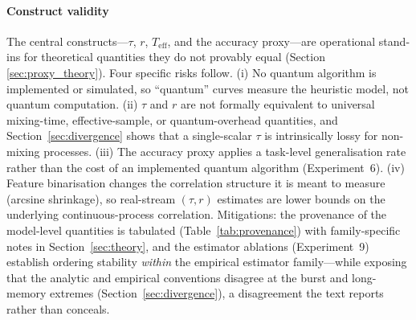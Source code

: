 \documentclass[sensors,article,submit,pdftex,moreauthors]{Definitions/mdpi}
\newcommand{\Teff}{T_{\mathrm{eff}}}
\providecommand{\DIFadd}[1]{{\protect\color{blue}#1}} %
\providecommand{\DIFdel}[1]{} %
\providecommand{\DIFaddbegin}{} %
\providecommand{\DIFaddend}{} %
\providecommand{\DIFdelbegin}{} %
\providecommand{\DIFdelend}{} %
\begin{document}
\paragraph{\DIFadd{Construct validity}} \DIFadd{The central constructs---$\tau$, }\DIFaddend $r$\DIFdelbegin \DIFdel{are paper-defined operational labels }\DIFdelend \DIFaddbegin \DIFadd{, $\Teff$, and the accuracy proxy---are operational stand-ins for theoretical quantities they do not provably equal }\DIFaddend (Section~\DIFdelbegin \DIFdel{\ref{sec:prelim}); equivalence to the exact correlation parameters of }%
\DIFdel{is not proven and is deferred to follow-on work. }%
\textbf{\DIFdel{Classical baselines are practical learners, not lower-bound-hard instances.}} %
\DIFdel{Online SGD, averaged SGD, }\DIFdelend \DIFaddbegin \DIFadd{\ref{sec:proxy_theory}). Four specific risks follow. (i) No quantum algorithm is implemented or simulated, so ``quantum'' curves measure the heuristic model, not quantum computation. (ii) $\tau$ }\DIFaddend and \DIFdelbegin \DIFdel{Count-Min are standard memory-bounded streaming }\DIFdelend \DIFaddbegin \DIFadd{$r$ are not formally equivalent to universal mixing-time, effective-sample, or quantum-overhead quantities, and Section~\ref{sec:divergence} shows that a single-scalar $\tau$ is intrinsically lossy for non-mixing processes. (iii) The accuracy proxy applies a task-level generalisation rate rather than the cost of an implemented quantum algorithm (Experiment~6). (iv) Feature binarisation changes the correlation structure it is meant to measure (arcsine shrinkage), so real-stream $(\tau, r)$ estimates are lower bounds on the underlying continuous-process correlation. Mitigations: the provenance of the model-level quantities is tabulated (Table~\ref{tab:provenance}) with family-specific notes in Section~\ref{sec:theory}, and the estimator ablations (Experiment~9) establish ordering stability }\emph{\DIFadd{within}} \DIFadd{the empirical estimator family---while exposing that the analytic and empirical conventions disagree at the burst and long-memory extremes (Section~\ref{sec:divergence}), a disagreement the text reports rather than conceals.
}
\end{document}
